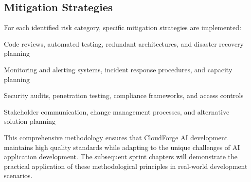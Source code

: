\subsection{Mitigation Strategies}

For each identified risk category, specific mitigation strategies are implemented:

\begin{description}[leftmargin=*]
    \item[Technical Risks] Code reviews, automated testing, redundant architectures, and disaster recovery planning
    \item[Operational Risks] Monitoring and alerting systems, incident response procedures, and capacity planning
    \item[Security Risks] Security audits, penetration testing, compliance frameworks, and access controls
    \item[Business Risks] Stakeholder communication, change management processes, and alternative solution planning
\end{description}

This comprehensive methodology ensures that CloudForge AI development maintains high quality standards while adapting to the unique challenges of AI application development. The subsequent sprint chapters will demonstrate the practical application of these methodological principles in real-world development scenarios.